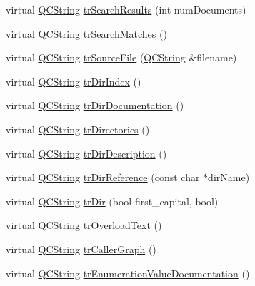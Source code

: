 \begin{DoxyCompactItemize}
\item 
virtual \mbox{\hyperlink{class_q_c_string}{Q\+C\+String}} \mbox{\hyperlink{class_translator_hungarian_a4b9bccef48cb366e4e33e92ec9268257}{tr\+Search\+Results}} (int num\+Documents)
\item 
virtual \mbox{\hyperlink{class_q_c_string}{Q\+C\+String}} \mbox{\hyperlink{class_translator_hungarian_a9723f96a4768f64d6d15011a00df5832}{tr\+Search\+Matches}} ()
\item 
virtual \mbox{\hyperlink{class_q_c_string}{Q\+C\+String}} \mbox{\hyperlink{class_translator_hungarian_a4ac0c0115d6fff54cb5c66bb0147c598}{tr\+Source\+File}} (\mbox{\hyperlink{class_q_c_string}{Q\+C\+String}} \&filename)
\item 
virtual \mbox{\hyperlink{class_q_c_string}{Q\+C\+String}} \mbox{\hyperlink{class_translator_hungarian_a9e8005c68c3da52b1063963e04ac0a51}{tr\+Dir\+Index}} ()
\item 
virtual \mbox{\hyperlink{class_q_c_string}{Q\+C\+String}} \mbox{\hyperlink{class_translator_hungarian_a625ababc758191f63da47ea9dbef3315}{tr\+Dir\+Documentation}} ()
\item 
virtual \mbox{\hyperlink{class_q_c_string}{Q\+C\+String}} \mbox{\hyperlink{class_translator_hungarian_ac19a7d4a46a93f69c01e9b207e3a4e9f}{tr\+Directories}} ()
\item 
virtual \mbox{\hyperlink{class_q_c_string}{Q\+C\+String}} \mbox{\hyperlink{class_translator_hungarian_a08342b2709d835860ee7b616621223fc}{tr\+Dir\+Description}} ()
\item 
virtual \mbox{\hyperlink{class_q_c_string}{Q\+C\+String}} \mbox{\hyperlink{class_translator_hungarian_ae228ae74c0bab192878d1dc4354bfbbe}{tr\+Dir\+Reference}} (const char $\ast$dir\+Name)
\item 
virtual \mbox{\hyperlink{class_q_c_string}{Q\+C\+String}} \mbox{\hyperlink{class_translator_hungarian_a269aaa56f3754bbc599b865351383b47}{tr\+Dir}} (bool first\+\_\+capital, bool)
\item 
virtual \mbox{\hyperlink{class_q_c_string}{Q\+C\+String}} \mbox{\hyperlink{class_translator_hungarian_ae753aff4068b68d25b1df5bb96059a44}{tr\+Overload\+Text}} ()
\item 
virtual \mbox{\hyperlink{class_q_c_string}{Q\+C\+String}} \mbox{\hyperlink{class_translator_hungarian_a35dc43e954432d28c07200593967528d}{tr\+Caller\+Graph}} ()
\item 
virtual \mbox{\hyperlink{class_q_c_string}{Q\+C\+String}} \mbox{\hyperlink{class_translator_hungarian_a11ea2035201831f5e1dd4a26f356a589}{tr\+Enumeration\+Value\+Documentation}} ()

\end{DoxyCompactItemize}
